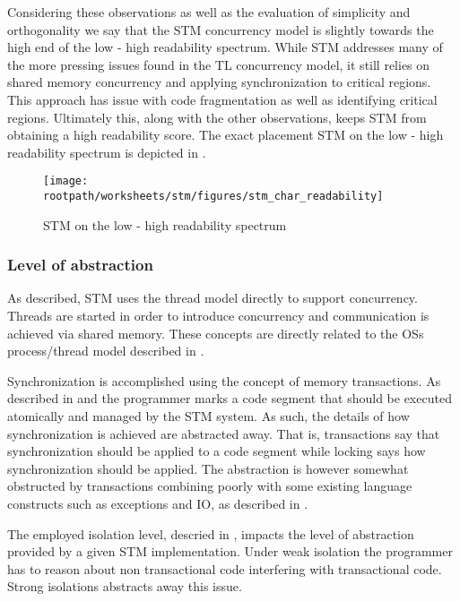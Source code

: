 Considering these observations as well as the evaluation of simplicity and orthogonality we say that the \ac{STM} concurrency model is slightly towards the high end of the low - high readability spectrum. While \ac{STM} addresses many of the more pressing issues found in the \ac{TL} concurrency model, it still relies on shared memory concurrency and applying synchronization to critical regions. This approach has issue with code fragmentation as well as identifying critical regions. Ultimately this, along with the other observations, keeps \ac{STM} from obtaining a high readability score. The exact placement \ac{STM} on the low - high readability spectrum is depicted in .

\begin{figure}[htbp]
\centering
 \texttt{[image: \\rootpath/worksheets/stm/figures/stm\_char\_readability]} 
 \caption{\ac{STM} on the low - high readability spectrum}
\label{fig:char_stm_readability}
\end{figure}

\subsubsection{Level of abstraction}\label{sec:stm_level_of_abstraction}
As described, \ac{STM} uses the thread model directly to support concurrency. Threads are started in order to introduce concurrency and communication is achieved via shared memory. These concepts are directly related to the \acp{OS} process/thread model described in .

Synchronization is accomplished using the concept of memory transactions. As described in  and  the programmer marks a code segment that should be executed atomically and managed by the \ac{STM} system. As such, the details of how synchronization is achieved are abstracted away. That is, transactions say that synchronization should be applied to a code segment while locking says how synchronization should be applied. The abstraction is however somewhat obstructed by transactions combining poorly with some existing language constructs such as exceptions and \ac{IO}, as described in \bsref{}.

The employed isolation level, descried in , impacts the level of abstraction provided by a given \ac{STM} implementation. Under weak isolation the programmer has to reason about non transactional code interfering with transactional code. Strong isolations abstracts away this issue.

